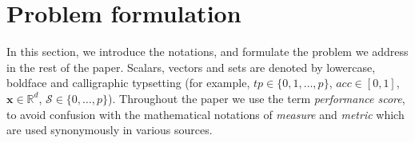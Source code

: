 \documentclass[5p, final]{elsarticle}
\begin{document}






\section{Problem formulation}
\label{sec:problem}

In this section, we introduce the notations, and formulate the problem we address in the rest of the paper. Scalars, vectors and sets are denoted by lowercase, boldface and calligraphic typsetting (for example, $tp\in \lbrace 0, 1, \dots, p\rbrace$, $acc\in [0, 1]$, $\mathbf{x}\in\mathbb{R}^d$, $\mathcal{S}\in\lbrace 0, \dots, p\rbrace$). Throughout the paper we use the term \emph{performance score}, to avoid confusion with the mathematical notations of \emph{measure} and \emph{metric} which are used synonymously in various sources.
\end{document}
